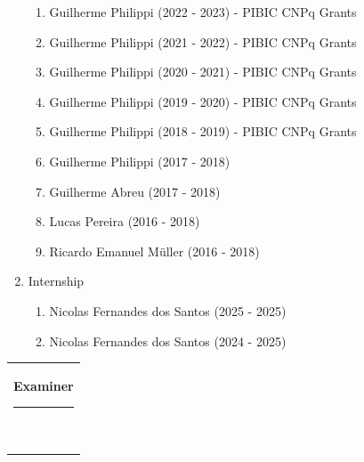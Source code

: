 \documentclass[10pt,A4,english]{article}
\newcommand{\mpwidth}{\linewidth-\fboxsep-\fboxsep}
\newcommand{\cvtext}[1] {
	\begin{tabular*}{1\mpwidth}{p{1.05\mpwidth}}
		\parbox{1\mpwidth}{#1}
	\end{tabular*}
}
\newcommand{\cvsection}[1] {
	\vspace{14pt}
	\cvtext{
		\textbf{\LARGE{\textcolor{darkcol}{#1}}}\\[-4pt]
		\textcolor{accentcol}{ \rule{0.2\textwidth}{1.5pt} } \\
	}
}
\begin{document}
\begin{paracol}{2}
\begin{rightcolumn}
\begin{enumerate}
\begin{enumerate}
        \item Guilherme Philippi (2022 - 2023) - PIBIC CNPq Grants
        
        \item Guilherme Philippi (2021 - 2022) - PIBIC CNPq Grants
        
        \item Guilherme Philippi (2020 - 2021) - PIBIC CNPq Grants
        
        \item Guilherme Philippi (2019 - 2020) - PIBIC CNPq Grants
        
        \item Guilherme Philippi (2018 - 2019) - PIBIC CNPq Grants
        
        \item Guilherme Philippi (2017 - 2018)
        
        \item Guilherme Abreu (2017 - 2018)
        
        \item Lucas Pereira (2016 - 2018)
        
        \item Ricardo Emanuel Müller (2016 - 2018)
    \end{enumerate}

    \item Internship
    \begin{enumerate}
		\item Nicolas Fernandes dos Santos (2025 - 2025)
		
        \item Nicolas Fernandes dos Santos (2024 - 2025)
    \end{enumerate}
\end{enumerate}



\cvsection{Examiner}


\end{rightcolumn}
\end{paracol}
\end{document}
